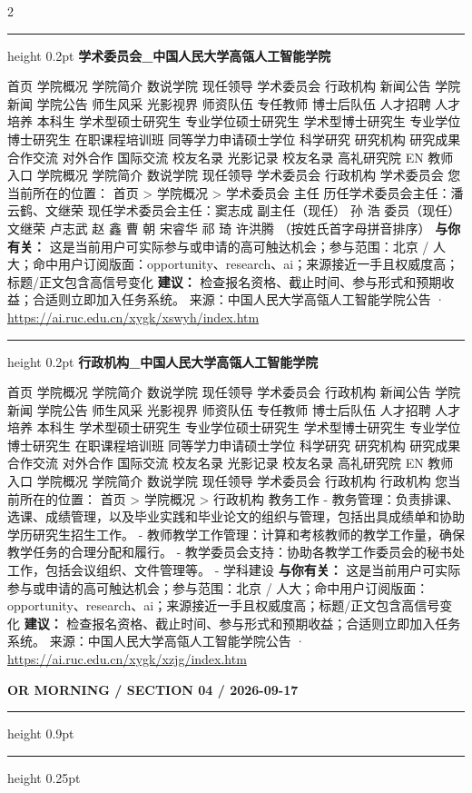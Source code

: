\documentclass[10.5pt]{ctexart}
\begin{document}
\begin{multicols}{2}
\vspace{2mm}
\hrule height 0.2pt
\vspace{2mm}
{\large\bfseries 学术委员会\_中国人民大学高瓴人工智能学院}\par
首页 学院概况 学院简介 数说学院 现任领导 学术委员会 行政机构 新闻公告 学院新闻 学院公告 师生风采 光影视界 师资队伍 专任教师 博士后队伍 人才招聘 人才培养 本科生 学术型硕士研究生 专业学位硕士研究生 学术型博士研究生 专业学位博士研究生 在职课程培训班 同等学力申请硕士学位 科学研究 研究机构 研究成果 合作交流 对外合作 国际交流 校友名录 光影记录 校友名录 高礼研究院 EN 教师入口 学院概况 学院简介 数说学院 现任领导 学术委员会 行政机构 学术委员会 您当前所在的位置： 首页 > 学院概况 > 学术委员会 主任 历任学术委员会主任：潘云鹤、文继荣 现任学术委员会主任：窦志成 副主任（现任） 孙 浩 委员（现任） 文继荣 卢志武 赵 鑫 曹 朝 宋睿华 祁 琦 许洪腾 （按姓氏首字母拼音排序）
\textbf{与你有关：} 这是当前用户可实际参与或申请的高可触达机会；参与范围：北京 / 人大；命中用户订阅版面：opportunity、research、ai；来源接近一手且权威度高；标题/正文包含高信号变化
\textbf{建议：} 检查报名资格、截止时间、参与形式和预期收益；合适则立即加入任务系统。
{\footnotesize\color{ormuted} 来源：中国人民大学高瓴人工智能学院公告 · \url{https://ai.ruc.edu.cn/xygk/xswyh/index.htm}}
\vspace{2mm}
\hrule height 0.2pt
\vspace{2mm}
{\large\bfseries 行政机构\_中国人民大学高瓴人工智能学院}\par
首页 学院概况 学院简介 数说学院 现任领导 学术委员会 行政机构 新闻公告 学院新闻 学院公告 师生风采 光影视界 师资队伍 专任教师 博士后队伍 人才招聘 人才培养 本科生 学术型硕士研究生 专业学位硕士研究生 学术型博士研究生 专业学位博士研究生 在职课程培训班 同等学力申请硕士学位 科学研究 研究机构 研究成果 合作交流 对外合作 国际交流 校友名录 光影记录 校友名录 高礼研究院 EN 教师入口 学院概况 学院简介 数说学院 现任领导 学术委员会 行政机构 行政机构 您当前所在的位置： 首页 > 学院概况 > 行政机构 教务工作 - 教务管理：负责排课、选课、成绩管理，以及毕业实践和毕业论文的组织与管理，包括出具成绩单和协助学历研究生招生工作。 - 教师教学工作管理：计算和考核教师的教学工作量，确保教学任务的合理分配和履行。 - 教学委员会支持：协助各教学工作委员会的秘书处工作，包括会议组织、文件管理等。 - 学科建设
\textbf{与你有关：} 这是当前用户可实际参与或申请的高可触达机会；参与范围：北京 / 人大；命中用户订阅版面：opportunity、research、ai；来源接近一手且权威度高；标题/正文包含高信号变化
\textbf{建议：} 检查报名资格、截止时间、参与形式和预期收益；合适则立即加入任务系统。
{\footnotesize\color{ormuted} 来源：中国人民大学高瓴人工智能学院公告 · \url{https://ai.ruc.edu.cn/xygk/xzjg/index.htm}}
\end{multicols}
\newpage
{\small\bfseries OR MORNING / SECTION 04 / 2026-09-17}
\vspace{2mm}
\hrule height 0.9pt
\vspace{1.5mm}
\hrule height 0.25pt
\vspace{4mm}
\end{document}
